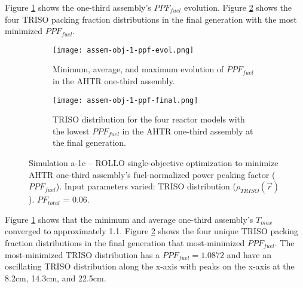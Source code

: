 Figure \ref{fig:assem-obj-1-ppf-evol} shows the one-third assembly's $PPF_{fuel}$ 
evolution. 
Figure \ref{fig:assem-obj-1-ppf-final} shows the four TRISO packing fraction 
distributions in the final generation with the most minimized $PPF_{fuel}$. 
\begin{figure}[htbp!]
    \centering
    \begin{subfigure}{\textwidth}
        \texttt{[image: assem-obj-1-ppf-evol.png]}
        \caption{Minimum, average, and maximum evolution of $PPF_{fuel}$ in the 
        AHTR one-third assembly.}
        \label{fig:assem-obj-1-ppf-evol} 
    \end{subfigure}
    \begin{subfigure}{\textwidth}
        \texttt{[image: assem-obj-1-ppf-final.png]}
        \caption{TRISO distribution for the four reactor models with the 
        lowest $PPF_{fuel}$ in the AHTR one-third assembly at the final generation.}
        \label{fig:assem-obj-1-ppf-final} 
    \end{subfigure}
    \caption{Simulation a-1c -- ROLLO single-objective optimization to minimize 
    AHTR one-third assembly's fuel-normalized power peaking factor ($PPF_{fuel}$). 
    Input parameters varied: TRISO distribution ($\rho_{TRISO}(\vec{r})$).
    $PF_{total}$ = 0.06.}
    \label{fig:assem-obj-1-ppf}
\end{figure}

Figure \ref{fig:assem-obj-1-ppf-evol} shows that the minimum and average 
one-third assembly's $T_{max}$ converged to approximately 1.1.
Figure \ref{fig:assem-obj-1-ppf-final} shows the four unique TRISO packing fraction 
distributions in the final generation that most-minimized $PPF_{fuel}$.
The most-minimized TRISO distribution has a $PPF_{fuel} = 1.0872$ and have an 
oscillating TRISO distribution along the x-axis with peaks on the x-axis at the 8.2cm, 
14.3cm, and 22.5cm. 

